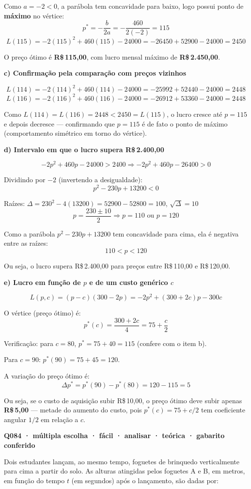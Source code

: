 \documentclass[11pt,a4paper]{article}
\begin{document}
Como $a = -2 < 0$, a parábola tem concavidade para baixo, logo possui ponto de \textbf{máximo} no vértice:
$$p^* = -\frac{b}{2a} = -\frac{460}{2(-2)} = 115$$
$$L(115) = -2(115)^2 + 460(115) - 24000 = -26450 + 52900 - 24000 = 2450$$

O preço ótimo é \textbf{R\$\,115,00}, com lucro mensal máximo de \textbf{R\$\,2.450,00}.

\textbf{c) Confirmação pela comparação com preços vizinhos}

$$L(114) = -2(114)^2+460(114)-24000 = -25992+52440-24000 = 2448$$
$$L(116) = -2(116)^2+460(116)-24000 = -26912+53360-24000 = 2448$$

Como $L(114) = L(116) = 2448 < 2450 = L(115)$, o lucro cresce até $p=115$ e depois decresce — confirmando que $p=115$ é de fato o ponto de máximo (comportamento simétrico em torno do vértice).

\textbf{d) Intervalo em que o lucro supera R\$\,2.400,00}

$$-2p^2+460p-24000 > 2400 \Rightarrow -2p^2+460p-26400>0$$

Dividindo por $-2$ (invertendo a desigualdade):
$$p^2 - 230p + 13200 < 0$$

Raízes: $\Delta = 230^2 - 4(13200) = 52900-52800=100$, $\sqrt{\Delta}=10$
$$p = \frac{230\pm10}{2} \Rightarrow p=110 \text{ ou } p=120$$

Como a parábola $p^2-230p+13200$ tem concavidade para cima, ela é negativa entre as raízes:
$$110 < p < 120$$

Ou seja, o lucro supera R\$\,2.400,00 para preços entre R\$\,110,00 e R\$\,120,00.

\textbf{e) Lucro em função de $p$ e de um custo genérico $c$}

$$L(p,c) = (p-c)(300-2p) = -2p^2 + (300+2c)p - 300c$$

O vértice (preço ótimo) é:
$$p^*(c) = \frac{300+2c}{4} = 75 + \frac{c}{2}$$

Verificação: para $c=80$, $p^*=75+40=115$ (confere com o item b).

Para $c=90$: $p^*(90) = 75+45=120$.

A variação do preço ótimo é:
$$\Delta p^* = p^*(90)-p^*(80) = 120-115 = 5$$

Ou seja, se o custo de aquisição subir R\$\,10,00, o preço ótimo deve subir apenas \textbf{R\$\,5,00} — metade do aumento do custo, pois $p^*(c)=75+c/2$ tem coeficiente angular $1/2$ em relação a $c$.

\bigskip\noindent\textbf{Q084 · múltipla escolha · fácil · analisar · teórica · gabarito conferido}\par\nopagebreak
Dois estudantes lançam, ao mesmo tempo, foguetes de brinquedo verticalmente para cima a partir do solo. As alturas atingidas pelos foguetes A e B, em metros, em função do tempo $t$ (em segundos) após o lançamento, são dadas por:
\end{document}
